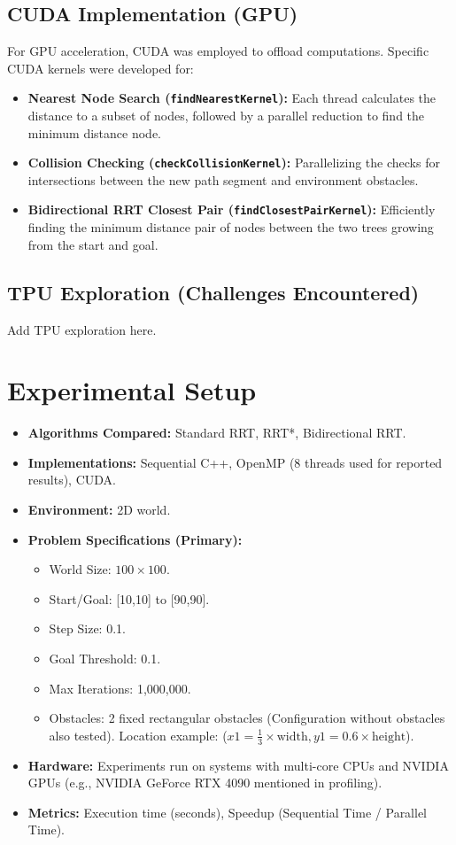 \documentclass{article}
\begin{document}
\subsection{CUDA Implementation (GPU)}
For GPU acceleration, CUDA was employed to offload computations. Specific CUDA kernels were developed for:
\begin{itemize}
    \item \textbf{Nearest Node Search (\texttt{findNearestKernel}):} Each thread calculates the distance to a subset of nodes, followed by a parallel reduction to find the minimum distance node.
    \item \textbf{Collision Checking (\texttt{checkCollisionKernel}):} Parallelizing the checks for intersections between the new path segment and environment obstacles.
    \item \textbf{Bidirectional RRT Closest Pair (\texttt{findClosestPairKernel}):} Efficiently finding the minimum distance pair of nodes between the two trees growing from the start and goal.
\end{itemize}

\subsection{TPU Exploration (Challenges Encountered)}

Add TPU exploration here.

\section{Experimental Setup}

\begin{itemize}
    \item \textbf{Algorithms Compared:} Standard RRT, RRT*, Bidirectional RRT.
    \item \textbf{Implementations:} Sequential C++, OpenMP (8 threads used for reported results), CUDA.
    \item \textbf{Environment:} 2D world.
    \item \textbf{Problem Specifications (Primary):}
        \begin{itemize}
            \item World Size: $100 \times 100$.
            \item Start/Goal: [10,10] to [90,90].
            \item Step Size: 0.1.
            \item Goal Threshold: 0.1.
            \item Max Iterations: 1,000,000.
            \item Obstacles: 2 fixed rectangular obstacles (Configuration without obstacles also tested). Location example: ($x1=\frac{1}{3}\times\text{width}, y1=0.6\times\text{height}$).
        \end{itemize}
    \item \textbf{Hardware:} Experiments run on systems with multi-core CPUs and NVIDIA GPUs (e.g., NVIDIA GeForce RTX 4090 mentioned in profiling).
    \item \textbf{Metrics:} Execution time (seconds), Speedup (Sequential Time / Parallel Time).
\end{itemize}
\end{document}
